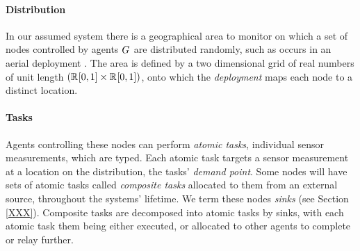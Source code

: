 
\paragraph{Distribution}
In our assumed system there is a geographical area to monitor on which a set of nodes controlled by agents $G_{}^{}$ are distributed randomly, such as occurs in an aerial deployment \citep{Kumar2013}.  The area is defined by a two dimensional grid of real numbers of unit length  $(\mathbb{R}_{}^{}[0,1] \times \mathbb{R}_{}^{}[0,1])$, onto which the \textit{deployment} maps each node to a distinct location.  

\paragraph{Tasks}
Agents controlling these nodes can perform \textit{atomic tasks}, individual sensor measurements, which are typed. Each atomic task targets a sensor measurement at a location on the distribution, the tasks' \textit{demand point}. Some nodes will have sets of atomic tasks called \textit{composite tasks} allocated to them from an external source, throughout the systems' lifetime. We term these nodes \textit{sinks} (see Section \ref{XXX}). Composite tasks are decomposed into atomic tasks by sinks, with each atomic task them being either executed, or allocated to other agents to complete or relay further.

